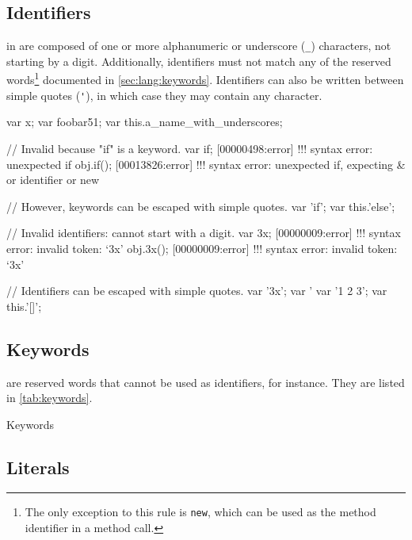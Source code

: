 \subsection{Identifiers}
\label{sec:lang:id}


 in \us are composed of one or more alphanumeric or
underscore (\lstinline|_|) characters, not starting by a digit.
Additionally, identifiers must not match any of the \us reserved
words\footnote{
  The only exception to this rule is \lstinline|new|, which can be
  used as the method identifier in a method call.
} documented in \autoref{sec:lang:keywords}. Identifiers can also be written
between simple quotes (\lstinline|'|), in which case they may contain any
character.

\begin{urbiscript}
var x;
var foobar51;
var this.a_name_with_underscores;

// Invalid because "if" is a keyword.
var if;
[00000498:error] !!! syntax error: unexpected if
obj.if();
[00013826:error] !!! syntax error: unexpected if, expecting & or identifier or new

// However, keywords can be escaped with simple quotes.
var 'if';
var this.'else';

// Invalid identifiers: cannot start with a digit.
var 3x;
[00000009:error] !!! syntax error: invalid token: `3x'
obj.3x();
[00000009:error] !!! syntax error: invalid token: `3x'

// Identifiers can be escaped with simple quotes.
var '3x';
var '%
var '1 2 3';
var this.'[]';
\end{urbiscript}

\subsection{Keywords}
\label{sec:lang:keywords}

 are reserved words that cannot be used as identifiers,
for instance.  They are listed in \autoref{tab:keywords}.

\renewcommand{\baselinestretch}{.85}
\begin{table}[\floatpos]
  \centering
  
  \caption{Keywords}
  \label{tab:keywords}
\end{table}
\renewcommand{\baselinestretch}{1}

\subsection{Literals}

